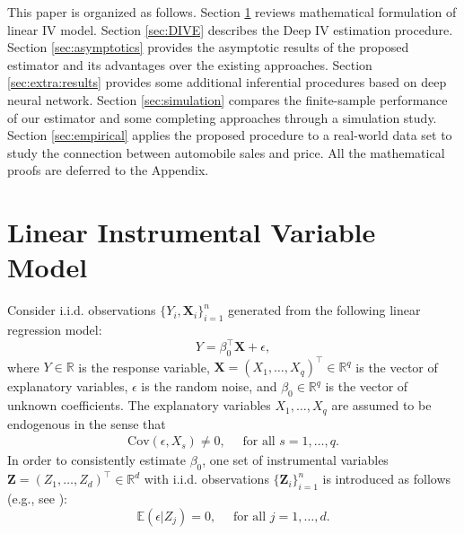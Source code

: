 \documentclass[11pt, preprint]{imsart}
\numberwithin{equation}{section}
\def \bfX{\mathbf{X}}
\def \bfZ{\mathbf{Z}}
\def \ev{\mathbb{E}}
\theoremstyle{plain}
\theoremstyle{definition}
\begin{document}

This paper is organized as follows. Section \ref{sec:model}
reviews mathematical formulation of linear IV model. Section \ref{sec:DIVE} describes the Deep IV estimation procedure. Section \ref{sec:asymptotics} provides the asymptotic results of the proposed estimator and its advantages over the existing approaches. {Section \ref{sec:extra:results} provides some additional inferential procedures based on deep neural network.} Section \ref{sec:simulation} compares the finite-sample performance of our estimator and some completing approaches
through a simulation study. Section \ref{sec:empirical} applies the proposed procedure to a real-world data set to study the connection between automobile sales and price.  All the mathematical proofs are deferred to the Appendix. 

\section{Linear Instrumental Variable Model}\label{sec:model}
Consider i.i.d. observations $\{Y_i, \bfX_i\}_{i=1}^n$ generated from the following linear regression model:
\begin{equation}\label{eq:model:1}
	Y=\beta_0^\top\bfX+\epsilon, 
\end{equation}
where $Y\in \mathbb{R}$ is the response variable, $\bfX=(X_{1},\ldots, X_{q})^\top\in \mathbb{R}^q$ is the vector of explanatory variables, $\epsilon$ is the random
noise, and $\beta_0\in \mathbb{R}^q$ is the vector of unknown coefficients. The explanatory variables $X_{1}, \ldots, X_{q}$ are assumed to be endogenous in the sense that 
\begin{eqnarray*}
 \textrm{Cov}(\epsilon, X_{s})\neq 0,\quad \textrm{ for all } s=1,\ldots, q.
\end{eqnarray*}
{In order to consistently estimate $\beta_0$, one set  of instrumental variables $\bfZ=(Z_{1},\ldots, Z_{d})^\top \in\mathbb{R}^d$ with i.i.d. observations $\{\bfZ_i\}_{i=1}^n$ is introduced as follows (e.g., see \citealp{wooldridge2008introductory}):}
\begin{equation}\label{eq:IV:Z}
	\ev(\epsilon| Z_{j})=0,\quad \textrm{ for all } j=1,\ldots, d.
\end{equation}
\end{document}
